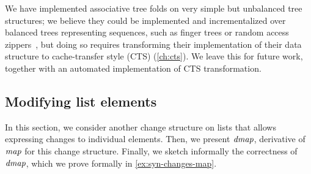 We have implemented associative tree folds on very simple but unbalanced tree
structures; we believe they could be implemented and incrementalized over
balanced trees representing sequences, such as finger trees or random access
zippers~\citep{Headley2016random}, but doing so requires transforming their
implementation of their data structure to cache-transfer style (CTS)
(\cref{ch:cts}). We leave this for future work, together with an
automated implementation of CTS transformation.



\subsection{Modifying list elements}
\label{sec:simple-changes-list-map}
In this section, we consider another change structure on lists that allows
expressing changes to individual elements.
Then, we present \ensuremath{\Varid{dmap}}, derivative of \ensuremath{\Varid{map}} for this change structure. Finally,
we sketch informally the correctness of \ensuremath{\Varid{dmap}}, which we prove formally in
\cref{ex:syn-changes-map}.

